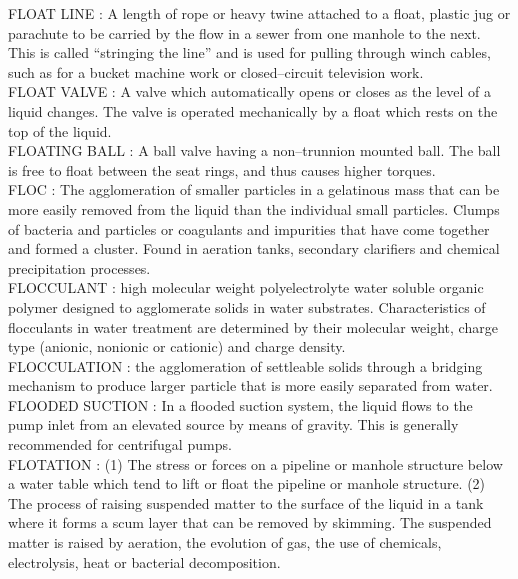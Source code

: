 \vspace{0.15cm}
FLOAT LINE :  A length of rope or heavy twine attached to a float, plastic jug or parachute to be carried by the flow in a sewer from one manhole to the next. This is called “stringing the line” and is used for pulling through winch cables, such as for a bucket machine work or closed–circuit television work. \\
\vspace{0.15cm}
FLOAT VALVE :   A valve which automatically opens or closes as the level of a liquid changes. The valve is operated mechanically by a float which rests on the top of the liquid.\\
\vspace{0.15cm}
FLOATING BALL :   A ball valve having a non–trunnion mounted ball. The ball is free to float between the seat rings, and thus causes higher torques.\\
\vspace{0.15cm}
FLOC :   The agglomeration of smaller particles in a gelatinous mass that can be more easily removed from the liquid than the individual small particles.  Clumps of bacteria and particles or coagulants and impurities that have come together and formed a cluster. Found in aeration tanks, secondary clarifiers and chemical precipitation processes.\\
\vspace{0.15cm}
FLOCCULANT :  high molecular weight polyelectrolyte water soluble organic polymer designed to agglomerate solids in water substrates. Characteristics of flocculants in water treatment are determined by their molecular weight, charge type (anionic, nonionic or cationic) and charge density.\\
\vspace{0.15cm}
FLOCCULATION :  the agglomeration of settleable solids through a bridging mechanism to produce larger particle that is more easily separated from water.\\
\vspace{0.15cm}
FLOODED SUCTION :   In a flooded suction system, the liquid flows to the pump inlet from an elevated source by means of gravity. This is generally recommended for centrifugal pumps.\\
\vspace{0.15cm}
FLOTATION :  (1) The stress or forces on a pipeline or manhole structure below a water table which tend to lift or float the pipeline or manhole structure. (2) The process of raising suspended matter to the surface of the liquid in a tank where it forms a scum layer that can be removed by skimming. The suspended matter is raised by aeration, the evolution of gas, the use of chemicals, electrolysis, heat or bacterial decomposition. \\
